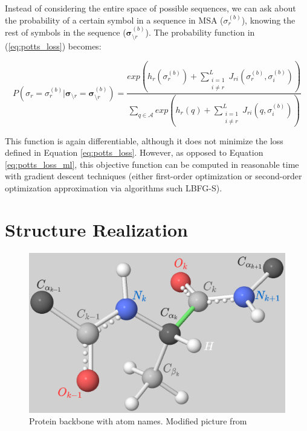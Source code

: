 Instead of considering the entire space of possible sequences, we can ask about the probability of a certain symbol in a sequence in MSA ($\sigma_r^{(b)}$), knowing the rest of symbols in the sequence ($\bm{\sigma}_{\setminus r}^{(b)}$). 
The probability function in (\ref{eq:potts_loss}) becomes:
        
\begin{equation}
    P(\sigma_{r} = \sigma_r^{(b)} | \bm{\sigma}_{\setminus r} = \bm{\sigma}_{\setminus r}^{(b)}) = 
        \frac
            {exp \left(h_r (\sigma_r^{(b)}) + \sum_{\substack{i = 1\\i\neq r}}^L J_{ri}(\sigma_r^{(b)}, \sigma_i^{(b)})\right)}
            {\sum_{q \in \mathcal{A}} exp \left(h_r(q) + \sum_{\substack{i = 1\\i\neq r}}^L J_{ri}(q, \sigma_i^{(b)})\right)}
\end{equation}
        
This function is again differentiable, although it does not minimize the loss defined in Equation \ref{eq:potts_loss}.
However, as opposed to Equation \ref{eq:potts_loss_ml}, this objective function can be computed in reasonable time with gradient descent techniques (either first-order optimization or second-order optimization approximation via algorithms such LBFG-S)\cite{potts1, potts2}.



\section{Structure Realization}

\begin{figure}[b]
    \centering
    \includegraphics[scale=0.5]{imgs_tomas/backbone.png}
    \caption{Protein backbone with atom names. Modified picture from \cite{ramachandran}}
    \label{fig:backbone}
\end{figure}

